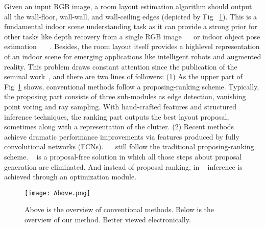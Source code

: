 \documentclass[10pt,twocolumn,letterpaper]{article}
\begin{document}
Given an input RGB image, a room layout estimation
algorithm should output all the wall-floor, wall-wall, and
wall-ceiling edges (depicted by Fig ~\ref{fig:overview}). This is a fundamental
indoor scene understanding task as it can provide
a strong prior for other tasks like depth recovery from a
single RGB image ~\cite{Eigen2014Depth}~\cite{Eigen_2014_CVPR} or indoor object pose estimation
~\cite{Song2014Sliding}~\cite{Gupta2015Aligning}~\cite{Song_2016_CVPR}. Besides, the room layout itself provides a highlevel
representation of an indoor scene for emerging applications
like intelligent robots and augmented reality. This
problem draws constant attention since the publication of
the seminal work~\cite{Hedau2010Recovering}, and there are two lines of followers:
(1) As the upper part of Fig~\ref{fig:overview}  shows, conventional methods
follow a proposing-ranking scheme. Typically, the proposing part consists of three sub-modules as edge detection,
vanishing point voting and ray sampling. With
hand-crafted features and structured inference techniques,
the ranking part outputs the best layout proposal, sometimes
along with a representation of the clutter.
(2) Recent methods~\cite{Mallya2015Learning}~\cite{Dasgupta2016DeLay}~\cite{Ren2016A} achieve dramatic performance
improvements via features produced by fully convolutional
networks (FCNs). ~\cite{Mallya2015Learning}~\cite{Ren2016A} still follow the traditional
proposing-ranking scheme. ~\cite{Dasgupta2016DeLay} is a proposal-free
solution in which all those steps about proposal generation
are eliminated. And instead of proposal ranking, in ~\cite{Dasgupta2016DeLay} inference
is achieved through an optimization module.\par

\begin{figure}[!htb]
\begin{center}
   \texttt{[image: Above.png]}
\end{center}
   \caption{Above is the overview of conventional methods. Below is the overview of our method. Better viewed electronically.}
\label{fig:overview}
\end{figure}

{\small


}
\end{document}
